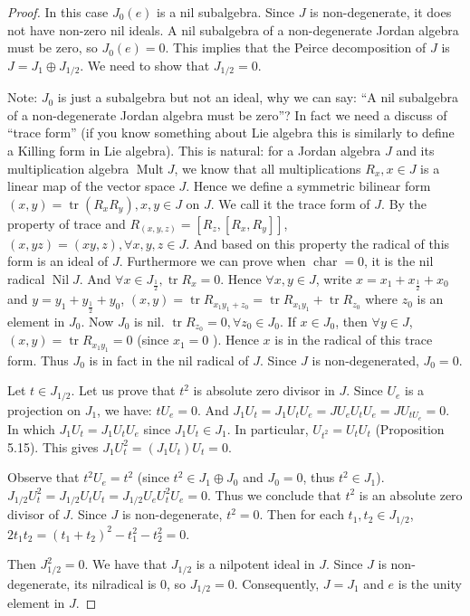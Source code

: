 \documentclass{article}
\begin{document}
\begin{proof} 
In this case $J_0(e)$ is a nil subalgebra. Since $J$ is non-degenerate, it does not have non-zero nil ideals. A nil subalgebra of a non-degenerate Jordan algebra must be zero, so $J_0(e)=0$. This implies that the Peirce decomposition of $J$ is $J = J_1 \oplus J_{1/2}$. We need to show that $J_{1/2}=0$.  

\begin{tcolorbox}[colback=gray!20, colframe=black] 
Note: $ J_0 $ is just a subalgebra but not an ideal, why we can say: ``A nil subalgebra of a non-degenerate Jordan algebra must be zero''? In fact we need a discuss of ``trace form'' (if you know something about Lie algebra this is similarly to define a Killing form in Lie algebra). This is natural: for a Jordan algebra $ J $ and its multiplication algebra $ \operatorname{Mult}J $, we know that all multiplications $ R_x, x\in J $ is a linear map of the vector space $ J $. Hence we define a symmetric bilinear form $ (x,y)=\operatorname{tr}(R_xR_y) , x,y \in J$ on $ J $. We call it the trace form of $ J $. By the property of trace and $ R_{(x,y,z)}=[R_z,[R_x,R_y]] $, $ (x,yz)=(xy,z), \forall x,y,z \in J $. And based on this property the radical of this form is an ideal of $ J $. Furthermore we can prove when $ \operatorname{char}=0 $, it is the nil radical $ \operatorname{Nil}J $. And $ \forall x \in J_{\frac{1}{2}}, \operatorname{tr}R_x=0 $. Hence $ \forall x,y \in J$, write $ x=x_1+x_{\frac{1}{2}}+x_0 $ and $ y=y_1+y_{\frac{1}{2}}+y_0 $, $(x,y)=\operatorname{tr}R_{x_1y_1+z_0} =\operatorname{tr}R_{x_1y_1}+\operatorname{tr}R_{z_0}$ where $ z_0 $ is an element in $ J_0 $. Now $ J_0 $ is nil. $\operatorname{tr}R_{z_0}=0, \forall z_0 \in J_0  $. If $ x \in J_0 $, then $ \forall y \in J $, $ (x,y)= \operatorname{tr}R_{x_1y_1}=0$ (since $ x_1=0 $ ). Hence $ x $ is in the radical of this trace form. Thus $ J_0 $ is in fact in the nil radical of $ J $. Since $ J $ is non-degenerated, $ J_0=0 $.                           
\end{tcolorbox}

Let $t \in J_{1/2}$. Let us prove that $ t^2 $ is absolute zero divisor in $ J $. Since $U_e$ is a projection on $J_1$, we have: $tU_e = 0$. And $J_1 U_t = J_1 U_t U_e = J U_e U_t U_e = JU_{tU_e}=0$. In which $ J_1 U_t = J_1 U_t U_e $ since $ J_1 U_t \in J_1 $. In particular, $U_{t^2} = U_t U_t$ (Proposition 5.15). This gives $J_1 U_t^2 = (J_1 U_t) U_t = 0$. 

Observe that $t^2 U_e = t^2$ (since $t^2 \in J_1 \oplus J_0$ and $J_0=0$, thus $t^2 \in J_1$). $J_{1/2} U_t^2 = J_{1/2} U_t U_t = J_{1/2} U_e U_t^2 U_e = 0$. Thus we conclude that $t^2$ is an absolute zero divisor of $J$. Since $J$ is non-degenerate, $t^2=0$. Then for each $t_1, t_2 \in J_{1/2}$, $2t_1t_2 = (t_1+t_2)^2 - t_1^2 - t_2^2 = 0.$ 

Then $J_{1/2}^2 = 0$. We have that $J_{1/2}$ is a nilpotent ideal in $J$. Since $J$ is non-degenerate, its nilradical is $0$, so $J_{1/2}=0$. Consequently, $J=J_1$ and $e$ is the unity element in $J$. 
\end{proof}
\end{document}
